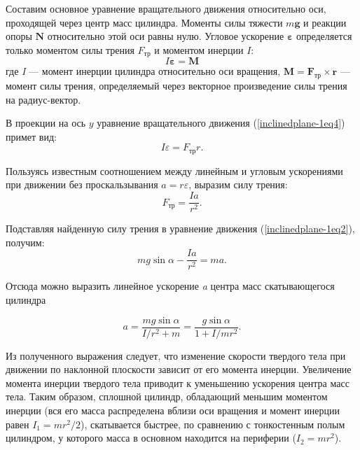 \documentclass[14pt,a4paper,oneside]{extarticle}	%
\begin{document}
	Составим основное уравнение вращательного движения относительно оси, проходящей через центр масс цилиндра. 
	Моменты силы тяжести  $	m\textbf{g} $ и реакции опоры $ \textbf{N} $ относительно этой оси равны нулю. 
	Угловое ускорение $ \textbf{ε} $ определяется только моментом силы трения $ F_{\text{тр}} $ и моментом инерции $ I $:
	\begin{equation}\label{inclinedplane-1eq4}
	 I\textbf{ε}=\textbf{M}
	\end{equation}
	где \textit{I} — момент инерции цилиндра относительно оси вращения, \linebreak $ \textbf{M} = \textbf{F}_{\text{тр}}\times \textbf{r} $ — момент силы трения, определяемый через векторное произведение силы трения на радиус-вектор.
	
	В проекции на ось $ y $ уравнение вращательного  движения (\ref{inclinedplane-1eq4}) примет вид:
	\begin{equation}\label{inclinedplane-1eq5}
	I\varepsilon = F_{\text{тр}} r.
	\end{equation}
	 
	Пользуясь известным соотношением между линейным и угловым ускорениями при движении без проскальзывания $ a = r\varepsilon $, выразим силу трения:
	\begin{equation}\label{inclinedplane-1eq6}
	F_{\text{тр}} = \frac{Ia}{r^{2}}.
	\end{equation}

	Подставляя найденную силу трения в уравнение движения (\ref{inclinedplane-1eq2}), получим:
		\begin{equation}\label{inclinedplane-1eq7}
		mg\sin\alpha -  \frac{Ia}{r^{2}} = ma.
	\end{equation}
	
	Отсюда можно выразить линейное ускорение \textit{a} центра масс скатывающегося цилиндра  

	\begin{equation}\label{8}
	a =  \frac{mg\sin\alpha}{I/r^{2} + m}  = \frac{g\sin\alpha}{1 + I/mr^{2}}.
	\end{equation} 
	  
	  Из полученного выражения следует, что изменение скорости твердого тела при движении по наклонной плоскости зависит от его момента инерции.
	 Увеличение момента инерции твердого тела приводит к уменьшению ускорения центра масс тела.
	 Таким образом, сплошной цилиндр, обладающий меньшим моментом инерции (вся его масса распределена вблизи оси вращения и момент инерции равен $ I_{1} = mr^{2}/2 $), скатывается быстрее, по сравнению с тонкостенным полым цилиндром, у которого масса в основном находится на периферии ($ I_{2} = mr^{2}  $).    
	
\end{document}
